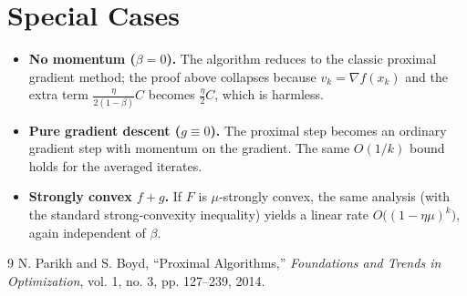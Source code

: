 \documentclass{article}
\begin{document}
\section*{Special Cases}
\begin{itemize}[leftmargin=*]
\item \textbf{No momentum ($\beta=0$).} The algorithm reduces to the classic proximal gradient method; the proof above collapses because $v_{k}=\nabla f(x_{k})$ and the extra term $\frac{\eta}{2(1-\beta)}C$ becomes $\frac{\eta}{2}C$, which is harmless.
\item \textbf{Pure gradient descent ($g\equiv0$).} The proximal step becomes an ordinary gradient step with momentum on the gradient. The same $O(1/k)$ bound holds for the averaged iterates.
\item \textbf{Strongly convex $f+g$.} If $F$ is $\mu$‑strongly convex, the same analysis (with the standard strong‑convexity inequality) yields a linear rate $O\!\bigl((1-\eta\mu)^{k}\bigr)$, again independent of $\beta$.
\end{itemize}

\begin{thebibliography}{9}
N. Parikh and S. Boyd, ``Proximal Algorithms,'' \emph{Foundations and Trends in Optimization}, vol. 1, no. 3, pp. 127–239, 2014.
\end{thebibliography}
\end{document}
